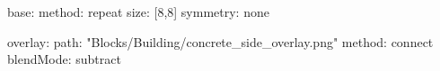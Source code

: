 base:
  method: repeat
  size: [8,8]
  symmetry: none

overlay:
  path: "Blocks/Building/concrete_side_overlay.png"
  method: connect
blendMode: subtract